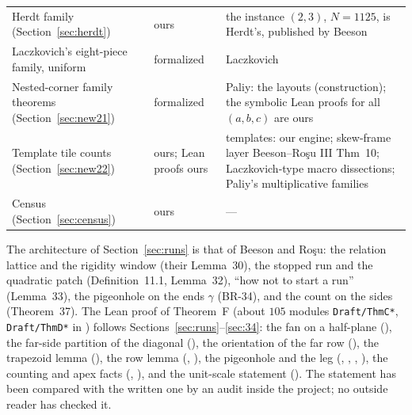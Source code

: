 \documentclass[11pt,reqno]{amsart}
\theoremstyle{plain}
\theoremstyle{definition}
\begin{document}
\begin{center}
\begin{tabular}{@{}p{5.1cm}p{1.7cm}p{6.2cm}@{}}
Herdt family (Section~\ref{sec:herdt}) & ours & the instance $(2,3)$, $N=1125$, is Herdt's, published by Beeson \cite{BeesonIso}\\
Laczkovich's eight-piece family, uniform & formalized & Laczkovich\\
Nested-corner family theorems (Section~\ref{sec:new21}) & formalized & Paliy: the layouts (construction); the symbolic Lean proofs for all $(a,b,c)$ are ours\\
Template tile counts (Section~\ref{sec:new22}) & ours; Lean proofs ours & templates: our engine; skew-frame layer Beeson--Ro\c{s}u III Thm~10; Laczkovich-type macro dissections; Paliy's multiplicative families\\
Census (Section~\ref{sec:census}) & ours & ---\\
\hline
\end{tabular}
\end{center}
The architecture of Section~\ref{sec:runs} is that of Beeson and Ro\c{s}u: the relation lattice and the rigidity window (their Lemma~30), the stopped run and the quadratic patch (Definition~11.1, Lemma~32), ``how not to start a run'' (Lemma~33), the pigeonhole on the ends $\gamma$ (BR-34), and the count on the sides (Theorem~37). The Lean proof of Theorem~F (about $105$ modules \texttt{Draft/ThmC*}, \texttt{Draft/ThmD*} in ) follows Sections~\ref{sec:runs}--\ref{sec:34}: the fan on a half-plane (), the far-side partition of the diagonal (), the orientation of the far row (), the trapezoid lemma (), the row lemma (, ), the pigeonhole and the leg (, , , ), the counting and apex facts (, ), and the unit-scale statement (). The statement has been compared with the written one by an audit inside the project; no outside reader has checked it.

\appendix
\end{document}
